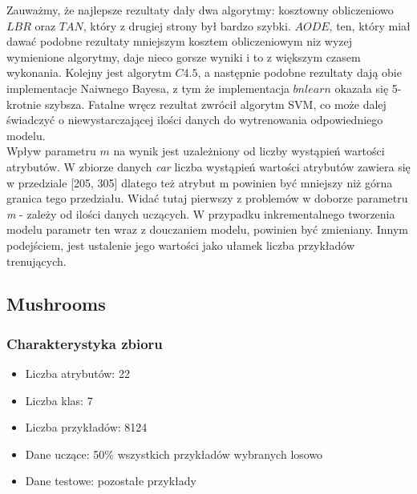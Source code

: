 \documentclass[16]{article}
\begin{document}
Zauważmy, że najlepsze rezultaty dały dwa algorytmy: kosztowny obliczeniowo $LBR$ oraz $TAN$, który z drugiej strony był bardzo szybki. $AODE$, ten, który miał dawać podobne rezultaty mniejszym kosztem obliczeniowym niz wyzej wymienione algorytmy, daje nieco gorsze wyniki i to z większym czasem wykonania. Kolejny jest algorytm $C4.5$, a następnie podobne rezultaty dają obie implementacje Naiwnego Bayesa, z tym że implementacja $bnlearn$ okazała się 5-krotnie szybsza. Fatalne wręcz rezultat zwrócił algorytm SVM, co może dalej świadczyć o niewystarczającej ilości danych do wytrenowania odpowiedniego modelu. \\ 
Wpływ parametru $m$ na wynik jest uzależniony od liczby wystąpień wartości atrybutów. W zbiorze danych \textit{car} liczba wystąpień wartości atrybutów zawiera się w przedziale [205, 305] dlatego też atrybut m powinien być mniejszy niż górna granica tego przedziału. Widać tutaj pierwszy z problemów w doborze parametru \textit{m} - zależy od ilości danych uczących. W przypadku inkrementalnego tworzenia modelu parametr ten wraz z douczaniem modelu, powinien być zmieniany. Innym podejściem, jest ustalenie jego wartości jako ułamek liczba przykładów trenujących.


\subsection{Mushrooms}
\subsubsection{Charakterystyka zbioru}
\begin{itemize}
  \item Liczba atrybutów: 22
	\item Liczba klas: 7
	\item Liczba przykładów: 8124
	\item Dane uczące: 50\% wszystkich przykładów wybranych losowo 
	\item Dane testowe: pozostałe przykłady
\end{itemize}
\end{document}
